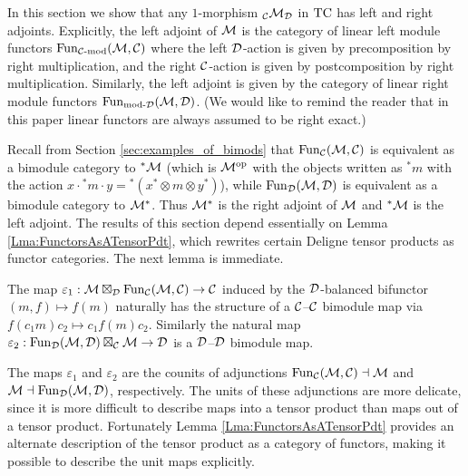 \documentclass{amsart}
\begin{document}
In this section we show that any $1$-morphism ${}_\mathcal C \mathcal M_\mathcal D$ in $\mathrm{TC}$ has left and right adjoints.   Explicitly, the left adjoint of $\mathcal M$ is the category of linear left module functors $\operatorname{Fun}_{{\mathcal C\text{-mod}}}(\mathcal M, \mathcal C)$ where the left $\mathcal D$-action is given by precomposition by right multiplication, and the right $\mathcal C$-action is given by postcomposition by right multiplication.  Similarly, the left adjoint is given by the category of linear right module functors $\operatorname{Fun}_{\text{mod-}\mathcal D}(\mathcal M, \mathcal D)$.   (We would like to remind the reader that in this paper linear functors are always assumed to be right exact.)  

Recall from Section \ref{sec:examples_of_bimods} that 
$\operatorname{Fun}_{{\mathcal C}}(\mathcal M, \mathcal C)$ is equivalent as a bimodule category to ${}^*\mathcal M$ (which is $\mathcal M^{\mathrm{op}}$ with the objects written as ${}^*m$ with the action $x \cdot {}^*m \cdot y = {}^*(x^* \otimes m \otimes y^*)$), while $\operatorname{Fun}_{\mathcal D}(\mathcal M, \mathcal D)$ is equivalent as a bimodule category to $\mathcal M^*$.  Thus $\mathcal M^*$ is the right adjoint of $\mathcal M$ and ${}^* \mathcal M$ is the left adjoint.
The results of this section depend essentially on Lemma \ref{Lma:FunctorsAsATensorPdt}, which rewrites certain Deligne tensor products as functor categories. The next lemma is immediate. 

\begin{lemma}
The map $\varepsilon_1: \mathcal M \boxtimes_{\mathcal D} \operatorname{Fun}_{\mathcal C}(\mathcal M, \mathcal C) \rightarrow \mathcal C$ induced by the $\mathcal D$-balanced bifunctor $(m, f) \mapsto f(m)$ naturally has the structure of a $\mathcal C$--$\mathcal C$ bimodule map via $ f(c_1 m) c_2 \mapsto c_1 f(m) c_2$. Similarly the natural map $\varepsilon_2: \operatorname{Fun}_{{\mathcal D}}(\mathcal M, \mathcal D) \boxtimes_{\mathcal C} \mathcal M \rightarrow \mathcal D$ is a $\mathcal D$--$\mathcal D$ bimodule map. 
\end{lemma} 

The maps $\varepsilon_1$ and $\varepsilon_2$ are the counits of adjunctions $\operatorname{Fun}_{\mathcal C}(\mathcal M, \mathcal C) \dashv \mathcal M$ and $\mathcal M \dashv \operatorname{Fun}_{{\mathcal D}}(\mathcal M, \mathcal D)$, respectively. The units of these adjunctions are more delicate, since it is more difficult to describe maps into a tensor product than maps out of a tensor product. Fortunately Lemma \ref{Lma:FunctorsAsATensorPdt} provides an alternate description of the tensor product as a category of functors, making it possible  to describe the unit maps explicitly. 
\end{document}
